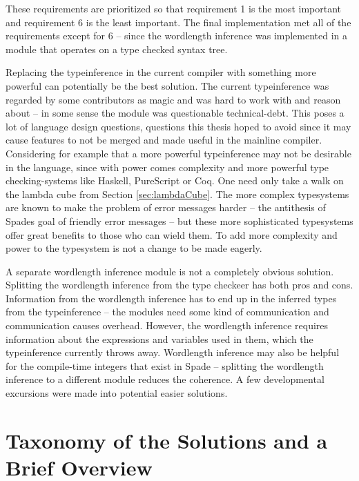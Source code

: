 These requirements are prioritized so that requirement 1 is the most important and requirement 6 is the least important. The final implementation met all of the requirements except for 6 -- since the wordlength inference was implemented in a module that operates on a type checked syntax tree.

Replacing the typeinference in the current compiler with something more powerful can potentially be the best solution. The current typeinference was regarded by some contributors as magic and was hard to work with and reason about -- in some sense the module was questionable technical-debt. This poses a lot of language design questions, questions this thesis hoped to avoid since it may cause features to not be merged and made useful in the mainline compiler. Considering for example that a more powerful typeinference may not be desirable in the language, since with power comes complexity and more powerful type checking-systems like Haskell, PureScript or Coq. One need only take a walk on the lambda cube from Section \ref{sec:lambdaCube}. The more complex typesystems are known to make the problem of error messages harder -- the antithesis of Spades goal of friendly error messages -- but these more sophisticated typesystems offer great benefits to those who can wield them. To add more complexity and power to the typesystem is not a change to be made eagerly.

A separate wordlength inference module is not a completely obvious solution. Splitting the wordlength inference from the type checkeer has both pros and cons. Information from the wordlength inference has to end up in the inferred types from the typeinference -- the modules need some kind of communication and communication causes overhead. However, the wordlength inference requires information about the expressions and variables used in them, which the typeinference currently throws away. Wordlength inference may also be helpful for the compile-time integers that exist in Spade -- splitting the wordlength inference to a different module reduces the coherence. A few developmental excursions were made into potential easier solutions.

\section{Taxonomy of the Solutions and a Brief Overview}

